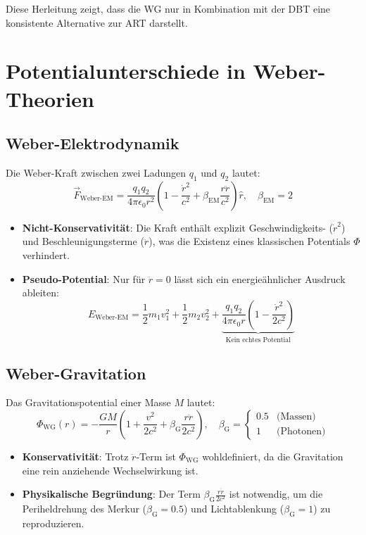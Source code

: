 Diese Herleitung zeigt, dass die WG nur in Kombination mit der DBT eine konsistente Alternative zur ART darstellt.

\section{Potentialunterschiede in Weber-Theorien}
\label{sec:weber_potentials}

\subsection{Weber-Elektrodynamik}
Die Weber-Kraft zwischen zwei Ladungen $q_1$ und $q_2$ lautet:
\[
\vec{F}_{\text{Weber-EM}} = \frac{q_1 q_2}{4\pi\epsilon_0 r^2} \left(1 - \frac{\dot{r}^2}{c^2} + \beta_{\text{EM}} \frac{r\ddot{r}}{c^2}\right)\hat{r}, \quad \beta_{\text{EM}} = 2
\]
\begin{itemize}
\item \textbf{Nicht-Konservativität}: Die Kraft enthält explizit Geschwindigkeits- ($\dot{r}^2$) und Beschleunigungsterme ($\ddot{r}$), was die Existenz eines klassischen Potentials $\Phi$ verhindert.
\item \textbf{Pseudo-Potential}: Nur für $\ddot{r} = 0$ lässt sich ein energieähnlicher Ausdruck ableiten:
\[
E_{\text{Weber-EM}} = \frac{1}{2}m_1v_1^2 + \frac{1}{2}m_2v_2^2 + \underbrace{\frac{q_1 q_2}{4\pi\epsilon_0 r}\left(1 - \frac{\dot{r}^2}{2c^2}\right)}_{\text{Kein echtes Potential}}
\]
\end{itemize}

\subsection{Weber-Gravitation}
Das Gravitationspotential einer Masse $M$ lautet:
\[
\Phi_{\text{WG}}(r) = -\frac{GM}{r}\left(1 + \frac{v^2}{2c^2} + \beta_{\text{G}} \frac{r\ddot{r}}{2c^2}\right), \quad \beta_{\text{G}} = 
\begin{cases}
0.5 & \text{(Massen)} \\
1 & \text{(Photonen)}
\end{cases}
\]
\begin{itemize}
\item \textbf{Konservativität}: Trotz $\ddot{r}$-Term ist $\Phi_{\text{WG}}$ wohldefiniert, da die Gravitation eine rein anziehende Wechselwirkung ist.
\item \textbf{Physikalische Begründung}: Der Term $\beta_{\text{G}}\frac{r\ddot{r}}{2c^2}$ ist notwendig, um die Periheldrehung des Merkur ($\beta_{\text{G}} = 0.5$) und Lichtablenkung ($\beta_{\text{G}} = 1$) zu reproduzieren.
\end{itemize}

